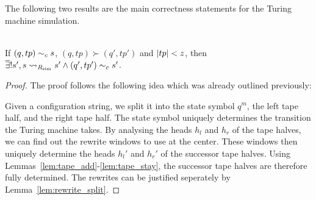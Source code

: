 The following two results are the main correctness statements for the Turing machine simulation.
\begin{lemma}\label{lem:stepsim}~\\
  If $(q, tp) \sim_c{} s$, $(q, tp) \succ (q', tp')$ and $|tp| < z$, then $\overline{\exists}! s', s \rightsquigarrow_{R_{\text{sim}}} s' \land (q', tp') \sim_c{} s'$. 
\end{lemma}
\begin{proof}
  The proof follows the following idea which was already outlined previously: 
  \begin{center}
  \end{center}
  Given a configuration string, we split it into the state symbol $q^m$, the left tape half, and the right tape half. The state symbol uniquely determines the transition the Turing machine takes. By analysing the heads $h_l$ and $h_r$ of the tape halves, we can find out the rewrite windows to use at the center. 
  These windows then uniquely determine the heads $h_l'$ and $h_r'$ of the successor tape halves. 
  Using Lemmas~\ref{lem:tape_add}-\ref{lem:tape_stay}, the successor tape halves are therefore fully determined. 
  The rewrites can be justified seperately by Lemma~\ref{lem:rewrite_split}.


\end{proof}
